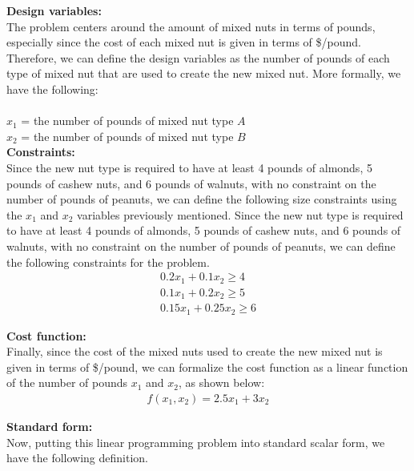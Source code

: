 \documentclass[11pt]{article}
\begin{document}
\begin{prob}{1}
\end{prob}
\begin{sol} 

\textbf{Design variables:} \\ 
The problem centers around the amount of mixed nuts in terms of pounds, especially since the cost of each mixed nut is given in terms of \$/pound. Therefore, we can define the design variables as the number of pounds of each type of mixed nut that are used to create the new mixed nut. More formally, we have the following: \\ \\
$x_{1}$ = the number of pounds of mixed nut type $A$ \\
$x_{2}$ = the number of pounds of mixed nut type $B$ \\

\textbf{Constraints:}  \\
Since the new nut type is required to have at least 4 pounds of almonds, 5 pounds of cashew nuts, and 6 pounds of walnuts, with no constraint on the number of pounds of peanuts, we can define the following size constraints using the $x_{1}$ and $x_{2}$ variables previously mentioned. 
Since the new nut type is required to have at least 4 pounds of almonds, 5 pounds of cashew nuts, and 6 pounds of walnuts, with no constraint on the number of pounds of peanuts, we can define the following constraints for the problem. 
\begin{eqnarray*}
0.2x_{1} + 0.1x_{2} \geq 4 \\
0.1x_{1} + 0.2x_{2} \geq 5 \\
0.15x_{1} + 0.25x_{2} \geq 6 
\end{eqnarray*}

\textbf{Cost function:} \\
Finally, since the cost of the mixed nuts used to create the new mixed nut is given in terms of \$/pound, we can formalize the cost function as a linear function of the number of pounds $x_{1}$ and $x_{2}$, as shown below:
\begin{eqnarray*}
f(x_{1},x_{2}) = 2.5x_{1} + 3x_{2}
\end{eqnarray*}

\textbf{Standard form:} \\
Now, putting this linear programming problem into standard scalar form, we have the following definition.  \\


\end{sol}
\end{document}
